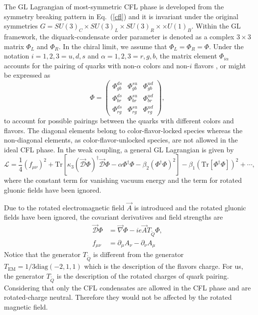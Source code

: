 \documentclass[prd, showpacs,nofootinbib,amsmath,amssymb]{revtex4}
\begin{document}
The GL Lagrangian of most-symmetric CFL phase is developed from the symmetry breaking pattern in Eq.~(\ref{cfl}) and it is invariant
under the original symmetries $G=SU(3)_C \times SU(3)_L\times SU(3)_R\times\times U(1)_B$. Within the GL framework, the
diquark-condensate order parameter is denoted as a complex $3\times3$ matrix $\Phi_L$ and $\Phi_R$.
In the chiral limit, we assume that $\Phi_L = \Phi_R = \Phi$.
Under the notation
$i = 1, 2, 3 = u, d, s$ and $\alpha = 1, 2, 3 = r, g, b$, the matrix element $\Phi_{i \alpha}$ accounts
for the pairing of quarks with non-$\alpha$ colors and non-$i$ flavors \cite{iida2002superfluid}, or might be expressed  as
\begin{equation}
  \label{eq:diquarkmatrix}
  \Phi =
  \begin{pmatrix}
    \Phi_{gb}^{ds} &  \Phi_{gb}^{su} & \Phi_{gb}^{ud} \\
    \Phi_{br}^{ds} &  \Phi_{br}^{su} & \Phi_{br}^{ud} \\
    \Phi_{rg}^{ds} &  \Phi_{rg}^{su} & \Phi_{rg}^{ud}
  \end{pmatrix},
\end{equation}
to account for possible pairings between the quarks with different colors and flavors.
The diagonal elements belong to color-flavor-locked species whereas the non-diagonal elements, as
color-flavor-unlocked species, are not allowed in the ideal CFL phase.
 In the weak coupling, a general GL Lagrangian 
is given by
\begin{equation}
\mathcal{L}= \frac{1}{4} (f_{\mu\nu})^2 +
\text{Tr}\left[\kappa_3(\vec{\mathcal{D}}\Phi)^\dagger\vec{\mathcal{D}}\Phi
  -\alpha\Phi^\dagger\Phi -\beta_2(\Phi^\dagger\Phi)^2\right]
-\beta_1(\text{Tr}[\Phi^\dagger\Phi])^2 +\cdots ,\label{gl}
\end{equation}
where the constant term for vanishing vacuum energy and the term for rotated gluonic fields have been
ignored.

Due to the rotated electromagnetic field $\vec{A}$ is introduced and the rotated gluonic fields have been ignored,
the covariant derivatives and field strengths are
\begin{eqnarray}
\vec{\mathcal{D}}\Phi &=\vec{\nabla} \Phi -ie\vec{A} T_{\widetilde{Q}}\Phi,\\
f_{\mu\nu} &= \partial_\mu A_\nu -\partial_\nu A_\mu
\end{eqnarray}
Notice that the generator $T_{\widetilde{Q}}$ is different from the generator $T_{\text{EM}} = 1/3\text{diag}(-2,1,1)$ which
is the description of the flavors charge. For us, the generator $T_{\widetilde{Q}}$ is the 
description of the rotated charges of quark pairing. Considering that only the CFL condensates are allowed in the CFL phase and are rotated-charge
neutral. Therefore they would not be affected by the rotated magnetic field.
\end{document}
